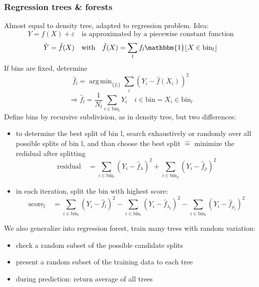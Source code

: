 \documentclass[11pt]{article}
\DeclareMathOperator*{\argmin}{arg\,min}
\DeclarePairedDelimiter\floor{\lfloor}{\rfloor}
\begin{document}
    \subsubsection{Regression trees & forests}
    Almost equal to density tree, adapted to regression problem. Idea:
    \begin{equation*}
      Y=f(X)+\varepsilon \quad \text{is approximated by a piecewise constant function}
    \end{equation*}
    \begin{equation*}
      \hat{Y}=\hat{f}(X) \quad \text{with} \quad \hat{f}(X)=\sum_l f_l \mathbbm{1}\floor{X \in \text{bin}_l}
    \end{equation*}
    If bins are fixed, determine
    \begin{equation*}
      \hat{f}_l=\argmin_{\{ f_l \}} \sum_i (Y_i-\hat{f}(X_i))^2
    \end{equation*}
    \begin{equation*}
      \Rightarrow \hat{f}_l=\frac{1}{N_l} \sum_{i \in \text{bin}_l} Y_i
      \quad i \in \text{bin} \widehat{=} X_i \in \text{bin}_l
    \end{equation*}
    Define bins by recursive subdivision, as in density tree, but two differences:
    \begin{itemize}
      \item to determine the best split of bin l, search exhaustively or
      randomly over all possible splits of bin l, and than choose the best split
      $\widehat{=}$ minimize the redidual after splitting
      \begin{equation*}
        \text{residual} \quad = \sum_{i \in \text{bin}_l} (Y_i-\hat{f}_\lambda)^2+\sum_{i \in \text{bin}_
        \rho}(Y_i -\hat{f}_\rho)^2
      \end{equation*}
      \item in each iteration, split the bin with highest score:
      \begin{equation*}
        \text{score}_l \quad = \sum_{i \in \text{bin}_l}(Y_i-\hat{f}_l)^2-
        \sum_{i \in \text{bin}_l}(Y_i-\hat{f}_{\lambda_l})^2-
        \sum_{i \in \text{bin}_l}(Y_i-\hat{f}_{\rho_l})^2
      \end{equation*}
    \end{itemize}
    We also generalize into regression forest, train many trees with random variation:
    \begin{itemize}
      \item check a random subset of the possible candidate splits
      \item present a random subset of the training data to each tree
      \item during prediction: return average of all trees
    \end{itemize}
\end{document}
